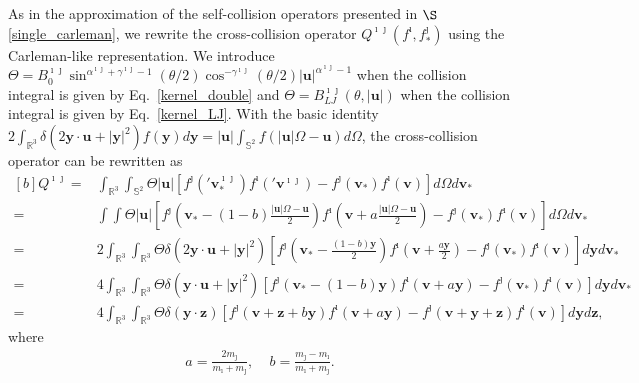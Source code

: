 As in the approximation of the self-collision operators presented in $\S$\ref{single_carleman}, we rewrite the cross-collision operator $Q^{\imath\jmath}(f^\imath,f^\jmath_*)$ using the Carleman-like representation. We  introduce $\Theta=B_0^{\imath\jmath}\sin^{\alpha^{\imath\jmath}+\gamma^{\imath\jmath}-1}({\theta}/{2})
\cos^{-\gamma^{\imath\jmath}}({\theta}/{2})|\textbf{u}|^{\alpha^{\imath\jmath}-1}$ when the collision integral is given by Eq.~\eqref{kernel_double} and $\Theta=B_{LJ}^{\imath\jmath}(\theta,|\textbf{u}|)$ when the collision integral is given by Eq.~\eqref{kernel_LJ}. With the basic identity $2\int_{\mathbb{R}^{3}}\delta(2\textbf{y}\cdot{\textbf{u}}+|\textbf{y}|^2)f(\textbf{y})d\textbf{y} ={|\textbf{u}|}\int_{\mathbb{S}^{2}}f(|\textbf{u}|\Omega-\textbf{u})d\Omega$, the cross-collision operator can be rewritten as
\begin{equation*}
\begin{aligned}[b]
{Q^{\imath\jmath}}=&\int_{\mathbb{R}^3}\int_{\mathbb{S}^2}\Theta|\textbf{u}|
  [f^\jmath('\textbf{v}^{\imath\jmath}_{\ast})f^\imath('\textbf{v}^{\imath\jmath})-f^\jmath(\textbf{v}_\ast)f^\imath(\textbf{v})]d\Omega d{\textbf{v}}_\ast \\
=&\int\int\Theta|\textbf{u}|
  \left[f^\jmath\left(\textbf{v}_{\ast}-(1-b)\frac{|\textbf{u}|\Omega-\textbf{u}}{2}\right)f^\imath\left(\textbf{v}+a\frac{|\textbf{u}|\Omega-\textbf{u}}{2}\right)-{f^\jmath}({\textbf{v}}_\ast){f^\imath}({\textbf{v}})\right]d\Omega d{\textbf{v}}_\ast \\
=&2\int_{\mathbb{R}^3}\int_{\mathbb{R}^3}\Theta\delta(2\textbf{y}\cdot{\textbf{u}}+|\textbf{y}|^2)
  \left[f^\jmath\left(\textbf{v}_{\ast}-\frac{(1-b)\textbf{y}}{2}\right)f^\imath\left(\textbf{v}+\frac{a\textbf{y}}{2}\right)-{f^\jmath}({\textbf{v}}_\ast){f^\imath}({\textbf{v}})\right]d\textbf{y} d{\textbf{v}}_\ast \\
=&4\int_{\mathbb{R}^3}\int_{\mathbb{R}^3}\Theta\delta(\textbf{y}\cdot{\textbf{u}}+|\textbf{y}|^2)
  [f^\jmath(\textbf{v}_{\ast}-(1-b)\textbf{y})f^\imath(\textbf{v}+a\textbf{y})-{f^\jmath}({\textbf{v}}_\ast){f^\imath}({\textbf{v}})]d\textbf{y} d{\textbf{v}}_\ast \\
=&4\int_{\mathbb{R}^3}\int_{\mathbb{R}^3}\Theta\delta(\textbf{y}\cdot{}\textbf{z})
  [f^\jmath(\textbf{v}+\textbf{z}+b\textbf{y})f^\imath(\textbf{v}+a\textbf{y})
  -f^\jmath(\textbf{v}+\textbf{y}+\textbf{z})f^\imath(\textbf{v})]d\textbf{y} d\textbf{z},
\end{aligned}
\end{equation*}
where
\begin{equation}\label{binary}
\begin{aligned}
    a=\frac{2m_\jmath}{m_\imath+m_\jmath}, \ \ \ \ \
    b=\frac{m_\jmath-m_\imath}{m_\imath+m_\jmath}.
\end{aligned}
\end{equation}



